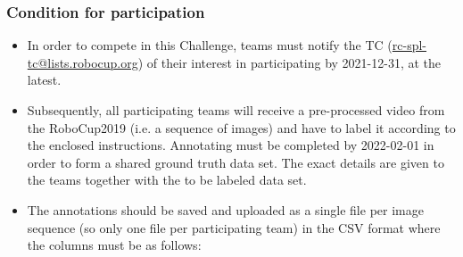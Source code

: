     \subsubsection{Condition for participation}
    \begin{itemize}
    \item In order to compete in this Challenge, teams must notify the TC (\url{rc-spl-tc@lists.robocup.org}) of their interest in participating by 2021-12-31, at the latest.
    \item Subsequently, all participating teams will receive a pre-processed video from the RoboCup2019 (i.e. a sequence of images) and have to label it according to the enclosed instructions. Annotating must be completed by 2022-02-01 in order to form a shared ground truth data set. The exact details are given to the teams together with the to be labeled data set.
    \item The annotations should be saved and uploaded as a single file per image sequence (so only one file per participating team) in the CSV format where the columns must be as follows:    


\end{itemize}
